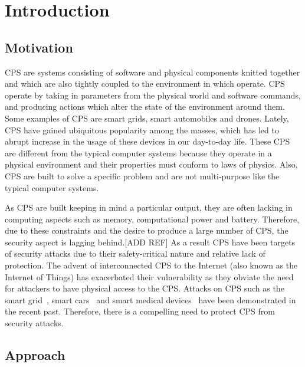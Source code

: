 
\chapter{Introduction}
\label{ch:Introduction}

\section{Motivation}
\label{sec:Motivation}
\ac{CPS} are systems consisting of software and physical components knitted together and which are also tightly coupled to the environment in which operate. \ac{CPS} operate by taking in parameters from the physical world and software commands, and producing actions which alter the state of the environment around them. Some examples of \ac{CPS} are smart grids, smart automobiles and drones. Lately, CPS have gained ubiquitous popularity among the masses, which has led to abrupt increase in the usage of these devices in our day-to-day life. These \ac{CPS} are different from the typical computer systems because they operate in a physical environment and their properties must conform to laws of physics. Also, \ac{CPS} are built to solve a specific problem and are not multi-purpose like the typical computer systems.

As \ac{CPS} are built keeping in mind a particular output, they are often lacking in computing aspects such as memory, computational power and battery. Therefore, due to these constraints and the desire to produce a large number of \ac{CPS}, the security aspect is lagging behind.[ADD REF] As a result CPS have been targets of security attacks due to their safety-critical nature and relative lack of protection. The advent of interconnected \ac{CPS} to the Internet (also known as the Internet of Things) has exacerbated their vulnerability as they obviate the need for attackers to have physical access to the \ac{CPS}. Attacks on \ac{CPS} such as the smart grid~\cite{skopik2012survey}, smart cars~\cite{checkoway2011comprehensive} and smart medical devices~\cite{leavitt2010researchers,radcliffe2011hacking} have been demonstrated in the recent past. 
Therefore, there is a compelling need to protect \ac{CPS} from security attacks. 

\section{Approach}
\label{sec:Approach}

